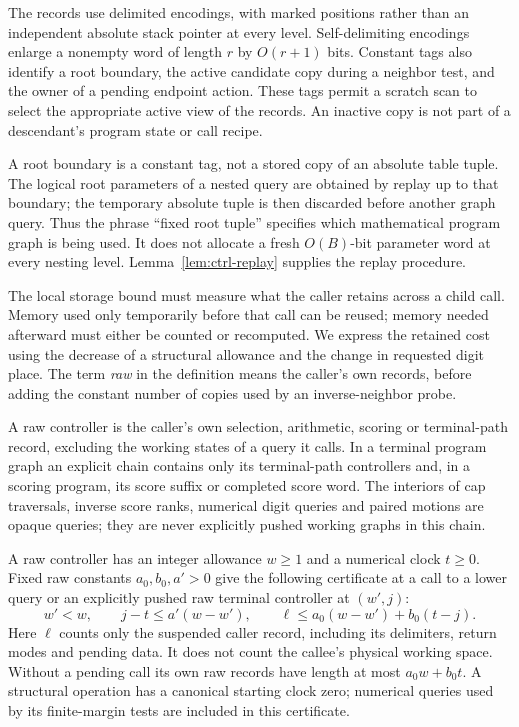 The records use delimited encodings, with marked positions rather than
an independent absolute stack pointer at every level.  Self-delimiting
encodings enlarge a nonempty word of length $r$ by $O(r+1)$ bits.
Constant tags also identify a root boundary, the active candidate copy
during a neighbor test, and the owner of a pending endpoint action.
These tags permit a scratch scan to select the appropriate active view
of the records.  An inactive copy is not part of a descendant's program
state or call recipe.

A root boundary is a constant tag, not a stored copy of an absolute
table tuple.  The logical root parameters of a nested query are obtained
by replay up to that boundary; the temporary absolute tuple is then
discarded before another graph query.  Thus the phrase ``fixed root
tuple'' specifies which mathematical program graph is being used.  It
does not allocate a fresh $O(B)$-bit parameter word at every nesting
level.  Lemma~\ref{lem:ctrl-replay} supplies the replay procedure.

The local storage bound must measure what the caller retains across a child call. Memory used only temporarily before that call can be reused; memory needed afterward must either be counted or recomputed. We express the retained cost using the decrease of a structural allowance and the change in requested digit place. The term \emph{raw} in the definition means the caller's own records, before adding the constant number of copies used by an inverse-neighbor probe.

\begin{definition}\label{def:ctrl-allowance}
A raw controller is the caller's own selection, arithmetic, scoring or
terminal-path record, excluding the working states of a query it calls.
In a terminal program graph an explicit chain contains only its
terminal-path controllers and, in a scoring program, its score suffix
or completed score word.  The interiors of cap traversals, inverse score
ranks, numerical digit queries and paired motions are opaque queries;
they are never explicitly pushed working graphs in this chain.

A raw controller has an integer allowance $w\ge1$ and a numerical clock
$t\ge0$.  Fixed raw constants $a_0,b_0,a'>0$ give the following
certificate at a call to a lower query or an explicitly pushed raw
terminal controller at $(w',j)$:
\begin{equation}\label{eq:ctrl-local-bound}
 w'<w,\qquad j-t\le a'(w-w'),\qquad
 \ell\le a_0(w-w')+b_0(t-j).
\end{equation}
Here $\ell$ counts only the suspended caller record, including its
delimiters, return modes and pending data.  It does not count the
callee's physical working space.  Without a pending call its own raw
records have length at most $a_0w+b_0t$.  A structural operation has a
canonical starting clock zero; numerical queries used by its
finite-margin tests are included in this certificate.
\end{definition}

